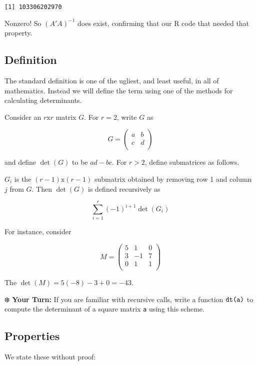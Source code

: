 \documentclass[
  letterpaper,
  DIV=11,
  numbers=noendperiod,
  oneside]{scrreprt}
\begin{document}
\begin{verbatim}
[1] 103306202970
\end{verbatim}

Nonzero! So \((A'A)^{-1}\) does exist, confirming that our R code that
needed that property.

\hypertarget{definition}{%
\subsection{Definition}\label{definition}}

The standard definition is one of the ugliest, and least useful, in all
of mathematics. Instead we will define the term using one of the methods
for calculating determinants.

Consider an \(r \textrm{x} r\) matrix \(G\). For \(r = 2\), write \(G\)
as

\[
 G = 
 \left (
 \begin{array}{rr}
 a & b \\
 c & d  \\
 \end{array}
 \right )
 \]

and define \(\det(G)\) to be \(ad -bc\). For \(r > 2\), define
submatrices as follows.

\(G_i\) is the \((r-1) \textrm{x} (r-1)\) submatrix obtained by removing
row 1 and column \(j\) from \(G\). Then \(\det(G)\) is defined
recursively as

\[
\sum_{i=1}^r (-1)^{i+1} \det(G_i)
\]

For instance, consider

\[
 M = 
 \left (
 \begin{array}{rrr}
 5 & 1 & 0 \\
 3 & -1 & 7 \\
  0 & 1 & 1 \\
  \end{array}
 \right )
\]

The \(\det(M) = 5(-8) - 3 + 0 = -43\).

❄️ \textbf{Your Turn:} If you are familiar with recursive calls, write a
function \(\verb+dt(a)+\) to compute the determinant of a square matrix
\lstinline{a} using this scheme.

\hypertarget{properties}{%
\subsection{Properties}\label{properties}}

We state these without proof:
\end{document}
